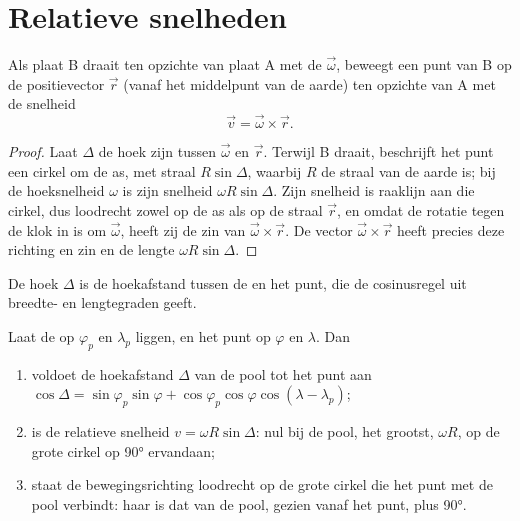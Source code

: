 \section{Relatieve snelheden}

\begin{theorem}\label{thm:b1:plate-kinematics:velocity}
Als plaat B draait ten opzichte van plaat A met de  $\vec\omega$, beweegt een punt van B op de positievector $\vec r$ (vanaf het middelpunt van de aarde) ten opzichte van A met de snelheid
\[
  \vec v = \vec\omega\times\vec r .
\]
\end{theorem}

\begin{proof}
Laat $\Delta$ de hoek zijn tussen $\vec\omega$ en $\vec r$. Terwijl B draait, beschrijft het punt een cirkel om de as, met straal $R\sin\Delta$, waarbij $R$ de straal van de aarde is; bij de hoeksnelheid $\omega$ is zijn snelheid $\omega R\sin\Delta$. Zijn snelheid is raaklijn aan die cirkel, dus loodrecht zowel op de as als op de straal $\vec r$, en omdat de rotatie tegen de klok in is om $\vec\omega$, heeft zij de zin van $\vec\omega\times\vec r$. De vector $\vec\omega\times\vec r$ heeft precies deze richting en zin en de lengte $\omega R\sin\Delta$.
\end{proof}

De hoek $\Delta$ is de hoekafstand tussen de  en het punt, die de cosinusregel uit breedte- en lengtegraden geeft.

\begin{proposition}\label{prop:b1:plate-kinematics:speed}
Laat de  op  $\varphi_p$ en  $\lambda_p$ liggen, en het punt op $\varphi$ en $\lambda$. Dan
\begin{enumerate}
  \item voldoet de hoekafstand $\Delta$ van de pool tot het punt aan
        $\cos\Delta = \sin\varphi_p\sin\varphi + \cos\varphi_p\cos\varphi
        \cos(\lambda - \lambda_p)$;
  \item is de relatieve snelheid $v = \omega R\sin\Delta$: nul bij de pool, het grootst, $\omega R$, op de grote cirkel op \ang{90} ervandaan;
  \item staat de bewegingsrichting loodrecht op de grote cirkel die het punt met de pool verbindt: haar  is dat van de pool, gezien vanaf het punt, plus \ang{90}.
\end{enumerate}
\end{proposition}

